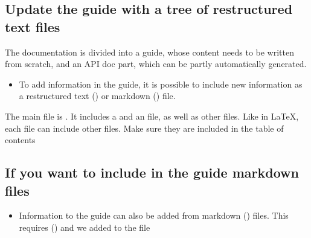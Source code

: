 \documentclass[letterpaper,10pt,english]{sphinxmanual}
\begin{document}
\subsection{Update the guide with a tree of restructured text files}
\label{\detokenize{toc-README-docs:update-the-guide-with-a-tree-of-restructured-text-files}}
The documentation is divided into a guide, whose content needs to be written
from scratch, and an API doc part, which can be partly automatically generated.
\begin{itemize}
\item {} 
To add information in the guide, it is possible to include new information
as a restructured text () or markdown () file.

\end{itemize}

The main file is . It includes a  and an 
file, as well as other files. Like in LaTeX, each file can include other files.
Make sure they are included in the table of contents

\begin{sphinxVerbatim}[commandchars=\\\{\}]
 
    
    

\end{sphinxVerbatim}


\subsection{If you want to include in the guide markdown files}
\label{\detokenize{toc-README-docs:if-you-want-to-include-in-the-guide-markdown-files}}\begin{itemize}
\item {} 
Information to the guide can also be added from markdown () files.
This requires  () and
we added to the  file

\end{itemize}

\begin{sphinxVerbatim}[commandchars=\\\{\}]
  \PYG{p}{[}\PYG{p}{]}
\end{sphinxVerbatim}
\end{document}
